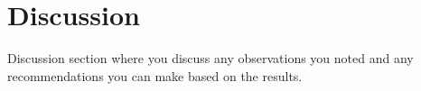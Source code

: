 \chapter{Discussion}
Discussion section where you discuss any observations you noted and any recommendations you can make based on the results.
